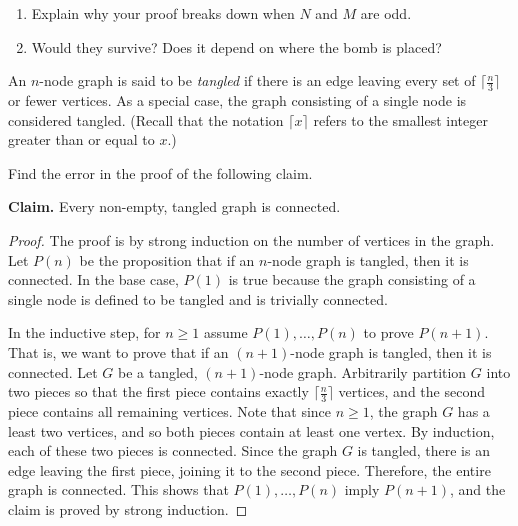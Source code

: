 \documentclass[12pt,twoside]{article}
\begin{document}
\begin{problem}{20}
\begin{enumerate}
{}

\item Explain why your proof breaks down when $N$ and
$M$ are odd.
\item
Would they survive? Does it depend on where the bomb is placed?
\end{enumerate}

\eparts
\end{problem}


\begin{problem}{20}

An $n$-node graph is said to be {\em tangled} if there is an edge
leaving every set of $\lceil\frac{n}{3}\rceil$ or fewer vertices.  As
a special case, the graph consisting of a single node is considered
tangled.  (Recall that the notation $\lceil x \rceil$ refers to the
smallest integer greater than or equal to $x$.)

\begin{problemparts}

 Find the error in the proof of the following claim.

\bigskip

{\bf Claim.} Every non-empty, tangled graph is connected.

\bigskip

\begin{proof}
The proof is by strong induction on the number of vertices in the
graph.  Let $P(n)$ be the proposition that if an $n$-node graph is
tangled, then it is connected.  In the base case, $P(1)$ is true
because the graph consisting of a single node is defined to be tangled
and is trivially connected.

In the inductive step, for $n \geq 1$ assume $P(1), \ldots, P(n)$ to
prove $P(n+1)$.  That is, we want to prove that if an $(n+1)$-node
graph is tangled, then it is connected.  Let $G$ be a tangled,
$(n+1)$-node graph.  Arbitrarily partition $G$ into two pieces so that
the first piece contains exactly $\lceil\frac{n}{3}\rceil$ vertices,
and the second piece contains all remaining vertices.  Note that since
$n \geq 1$, the graph $G$ has a least two vertices, and so both pieces
contain at least one vertex.  By induction, each of these two pieces
is connected.  Since the graph $G$ is tangled, there is an edge
leaving the first piece, joining it to the second piece.  Therefore,
the entire graph is connected.  This shows that $P(1), \ldots, P(n)$
imply $P(n+1)$, and the claim is proved by strong induction.
\end{proof}


\end{problemparts}
\end{problem}
\end{document}
